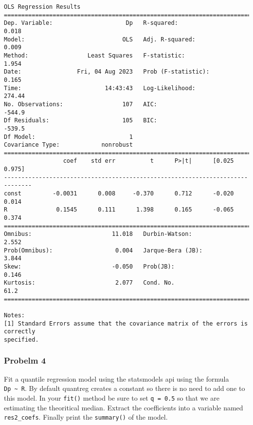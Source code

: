 \documentclass[11pt]{article}
\begin{document}
    \begin{Verbatim}[commandchars=\\\{\}]
                            OLS Regression Results
==============================================================================
Dep. Variable:                     Dp   R-squared:                       0.018
Model:                            OLS   Adj. R-squared:                  0.009
Method:                 Least Squares   F-statistic:                     1.954
Date:                Fri, 04 Aug 2023   Prob (F-statistic):              0.165
Time:                        14:43:43   Log-Likelihood:                 274.44
No. Observations:                 107   AIC:                            -544.9
Df Residuals:                     105   BIC:                            -539.5
Df Model:                           1
Covariance Type:            nonrobust
==============================================================================
                 coef    std err          t      P>|t|      [0.025      0.975]
------------------------------------------------------------------------------
const         -0.0031      0.008     -0.370      0.712      -0.020       0.014
R              0.1545      0.111      1.398      0.165      -0.065       0.374
==============================================================================
Omnibus:                       11.018   Durbin-Watson:                   2.552
Prob(Omnibus):                  0.004   Jarque-Bera (JB):                3.844
Skew:                          -0.050   Prob(JB):                        0.146
Kurtosis:                       2.077   Cond. No.                         61.2
==============================================================================

Notes:
[1] Standard Errors assume that the covariance matrix of the errors is correctly
specified.
    \end{Verbatim}

    \hypertarget{probelm-4}{%
\subsubsection{Probelm 4}\label{probelm-4}}

Fit a quantile regression model using the statsmodels api using the
formula \texttt{Dp\ \textasciitilde{}\ R}. By default quantreg creates a
constant so there is no need to add one to this model. In your
\texttt{fit()} method be sure to set \texttt{q\ =\ 0.5} so that we are
estimating the theoritical median. Extract the coefficients into a
variable named \texttt{res2\_coefs}. Finally print the
\texttt{summary()} of the model.
\end{document}
